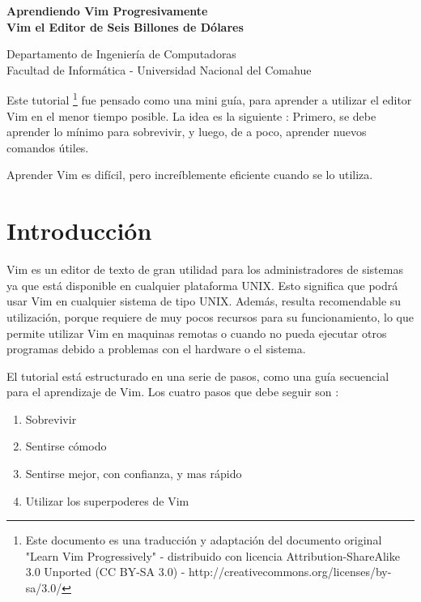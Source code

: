 \documentclass[12pt]{article}
\def\maketitle{

 \makeatletter
 {\color{bl} \centering \huge \sc \textbf{
 Aprendiendo Vim Progresivamente \\ 
\large \vspace*{-8pt} \color{black} Vim el Editor de Seis Billones de Dólares
 \vspace*{8pt} }\par}
 \makeatother


 \makeatletter
 {\centering \small 
 	Departamento de Ingeniería de Computadoras \\
 	Facultad de Informática - Universidad Nacional del Comahue \\
 	\vspace{20pt} }
 \makeatother

}
\begin{document}
\thispagestyle{empty}
\maketitle
\setlength{\parindent}{0pt}




Este tutorial
\footnote{Este documento es una traducción y adaptación del documento
original "Learn Vim Progressively" - distribuido con licencia
Attribution-ShareAlike 3.0 Unported (CC BY-SA 3.0) - 
http://creativecommons.org/licenses/by-sa/3.0/}
fue pensado como una mini guía, para aprender a utilizar el editor Vim 
en el menor tiempo posible. La idea
es la siguiente : Primero, se debe aprender lo mínimo para sobrevivir,
y luego, de a poco, aprender nuevos comandos útiles.

Aprender Vim es difícil, pero increíblemente eficiente cuando se lo utiliza.

\section{Introducción}

Vim es un editor de texto de gran utilidad para los administradores de sistemas ya
que está disponible en cualquier plataforma UNIX. Esto significa
que podrá usar Vim en cualquier sistema de tipo UNIX. Además,
resulta recomendable su utilización, porque requiere de muy pocos
recursos para su funcionamiento, lo que permite utilizar Vim
en maquinas remotas o cuando no pueda ejecutar otros programas
debido a problemas con el hardware o el sistema.


El tutorial está estructurado en una serie de pasos, como una guía
secuencial para el aprendizaje de Vim. Los cuatro pasos que debe seguir son :

\begin{enumerate}
	\item Sobrevivir
	\item Sentirse cómodo
	\item Sentirse mejor, con confianza, y mas rápido
	\item Utilizar los superpoderes de Vim
\end{enumerate}
\end{document}
